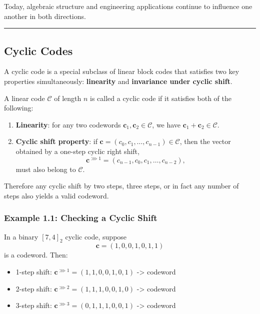 \documentclass[
]{article}
\providecommand{\tightlist}{%
  \setlength{\itemsep}{0pt}\setlength{\parskip}{0pt}}
\begin{document}
Today, algebraic structure and engineering applications continue to
influence one another in both directions.

\begin{center}\rule{0.5\linewidth}{0.5pt}\end{center}

\subsection{Cyclic Codes}\label{what-is-a-cyclic-code}

A cyclic code is a special subclass of linear block codes that satisfies
two key properties simultaneously: \textbf{linearity} and
\textbf{invariance under cyclic shift}.

A linear code \(\mathcal{C}\) of length \(n\) is called a cyclic code if
it satisfies both of the following:

\begin{enumerate}
\def\labelenumi{\arabic{enumi}.}
\tightlist
\item
  \textbf{Linearity}: for any two codewords
  \(\mathbf{c}_1, \mathbf{c}_2 \in \mathcal{C}\), we have
  \(\mathbf{c}_1 + \mathbf{c}_2 \in \mathcal{C}\).
\item
  \textbf{Cyclic shift property}: if
  \(\mathbf{c} = (c_0, c_1, \dots, c_{n-1}) \in \mathcal{C}\), then the
  vector obtained by a one-step cyclic right shift,
  \[\mathbf{c}^{\ggg 1} = (c_{n-1}, c_0, c_1, \dots, c_{n-2}),\] must
  also belong to \(\mathcal{C}\).
\end{enumerate}

Therefore any cyclic shift by two steps, three steps, or in fact any
number of steps also yields a valid codeword.

\subsubsection{Example 1.1: Checking a Cyclic
Shift}\label{example-1.1-checking-a-cyclic-shift}

In a binary \([7,4]_2\) cyclic code, suppose
\[\mathbf{c} = (1,0,0,1,0,1,1)\] is a codeword. Then:

\begin{itemize}
\tightlist
\item
  1-step shift: \(\mathbf{c}^{\ggg 1} = (1,1,0,0,1,0,1)\)
  -\textgreater{} codeword
\item
  2-step shift: \(\mathbf{c}^{\ggg 2} = (1,1,1,0,0,1,0)\)
  -\textgreater{} codeword
\item
  3-step shift: \(\mathbf{c}^{\ggg 3} = (0,1,1,1,0,0,1)\)
  -\textgreater{} codeword
\end{itemize}
\end{document}

